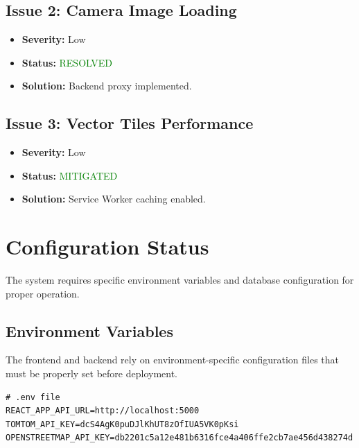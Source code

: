 \subsection{Issue 2: Camera Image Loading}

\begin{itemize}
    \item \textbf{Severity:} Low
    \item \textbf{Status:} \textcolor{green}{RESOLVED}
    \item \textbf{Solution:} Backend proxy implemented.
\end{itemize}

\subsection{Issue 3: Vector Tiles Performance}

\begin{itemize}
    \item \textbf{Severity:} Low
    \item \textbf{Status:} \textcolor{green}{MITIGATED}
    \item \textbf{Solution:} Service Worker caching enabled.
\end{itemize}

\section{Configuration Status}

The system requires specific environment variables and database configuration for proper operation.

\subsection{Environment Variables}

The frontend and backend rely on environment-specific configuration files that must be properly set before deployment.

\begin{tcolorbox}[colback=gray!10,colframe=black!50,arc=2mm,title=Frontend Environment Variables (.env)]
\begin{verbatim}
# .env file
REACT_APP_API_URL=http://localhost:5000
TOMTOM_API_KEY=dcS4AgK0puDJlKhUT8zOfIUA5VK0pKsi
OPENSTREETMAP_API_KEY=db2201c5a12e481b6316fce4a406ffe2cb7ae456d438274d
\end{verbatim}
\end{tcolorbox}

